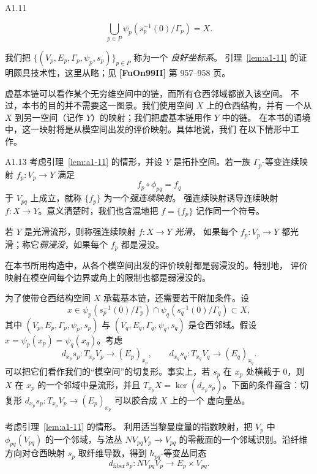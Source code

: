 \begin{lemma}{A1.11}
\begin{description}[style=multiline,leftmargin=8.2em,labelwidth=7.5em]
\item[\textup{(A1.12.3)}]
\[
 \bigcup_{p\in P}\psi_p(s_p^{-1}(0)/\Gamma_p)=X.
\]
\end{description}
\end{lemma}

我们把 $\{(V_p,E_p,\Gamma_p,\psi_p,s_p)\}_{p\in P}$ 称为一个
\emph{良好坐标系}。
引理~\ref{lem:a1-11} 的证明颇具技术性，这里从略；见
\textbf{[FuOn99II]} 第 957--958 页。

虚基本链可以看作某个无穷维空间中的链，而所有仓西邻域都嵌入该空间。
不过，本书的目的并不需要这一图景。我们使用空间 $X$ 上的仓西结构，并有
一个从 $X$ 到另一空间（记作 $Y$）的映射；我们把虚基本链用作 $Y$ 中的链。
在本书的语境中，这一映射将是从模空间出发的评价映射。具体地说，我们
在以下情形中工作。

\begin{definition}{A1.13}\label{def:a1-13}
考虑引理~\ref{lem:a1-11} 的情形，并设 $Y$ 是拓扑空间。若一族
$\Gamma_p$-等变连续映射 $f_p\colon V_p\to Y$ 满足
\[
 f_p\circ\phi_{pq}=f_q
\]
于 $V_{pq}$ 上成立，就称 $\{f_p\}$ 为一个\emph{强连续映射}。
强连续映射诱导连续映射 $f\colon X\to Y$。意义清楚时，我们也含混地把
$f=\{f_p\}$ 记作同一个符号。

若 $Y$ 是光滑流形，则称强连续映射 $f\colon X\to Y$ \emph{光滑}，
如果每个 $f_p\colon V_p\to Y$ 都光滑；称它\emph{弱浸没}，如果每个
$f_p$ 都是浸没。
\end{definition}

在本书所用构造中，从各个模空间出发的评价映射都是弱浸没的。特别地，
评价映射在模空间每个边界或角上的限制也都是弱浸没的。

为了使带仓西结构空间 $X$ 承载基本链，还需要若干附加条件。设
\[
 x\in
 \psi_p(s_p^{-1}(0)/\Gamma_p)
 \cap\psi_q(s_q^{-1}(0)/\Gamma_q)\subset X,
\]
其中 $(V_p,E_p,\Gamma_p,\psi_p,s_p)$ 与
$(V_q,E_q,\Gamma_q,\psi_q,s_q)$ 是仓西邻域。假设
$x=\psi_p(x_p)=\psi_q(x_q)$。考虑
\[
 d_{x_p}s_p\colon T_{x_p}V_p\longrightarrow(E_p)_{x_p},
 \qquad
 d_{x_q}s_q\colon T_{x_q}V_q\longrightarrow(E_q)_{x_q}.
\]
可以把它们看作我们的“模空间”的切复形。事实上，若 $s_p$ 在 $x_p$
处横截于 $0$，则 $X$ 在 $x_p$ 的一个邻域中是流形，并且
$T_{x_p}X=\ker(d_{x_p}s_p)$。下面的条件蕴含：切复形
$d_{x_p}s_p\colon T_{x_p}V_p\to(E_p)_{x_p}$ 可以胶合成 $X$ 上的一个
虚向量丛。

考虑引理~\ref{lem:a1-11} 的情形。
利用适当黎曼度量的指数映射，把
$V_p$ 中 $\phi_{pq}(V_{pq})$ 的一个邻域，与法丛
$NV_{pq}V_p\to V_{pq}$ 的零截面的一个邻域识别。沿纤维方向对仓西映射
$s_p$ 取纤维导数，得到 $h_{pq}$-等变丛同态
\[
 d_{\mathrm{fiber}}s_p\colon NV_{pq}V_p
 \longrightarrow E_p\times V_{pq}.
\]

